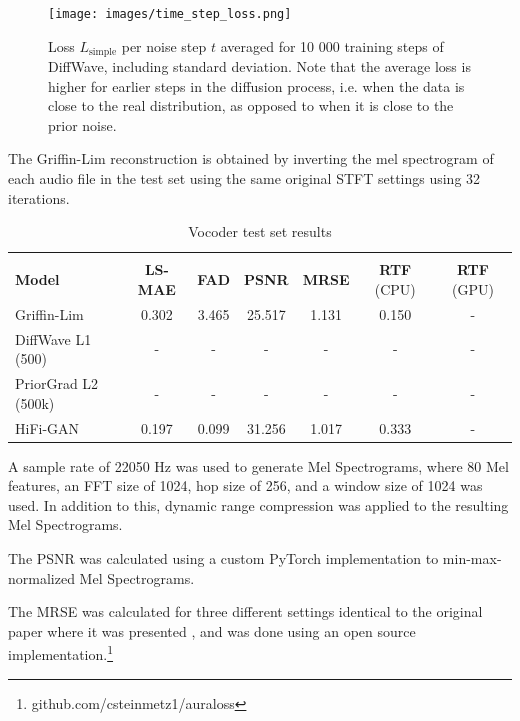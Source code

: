 \documentclass{article}
\begin{document}
\begin{figure}[H]
    \centering
    \texttt{[image: images/time\_step\_loss.png]}
    \caption{\onehalfspacing Loss $L_{\text{simple}}$ per noise step $t$ averaged for 10 000 training steps of DiffWave, including standard deviation. Note that the average loss is higher for earlier steps in the diffusion process, i.e. when the data is close to the real distribution, as opposed to when it is close to the prior noise.}
    \label{fig:timestep_loss}
\end{figure}

The Griffin-Lim reconstruction is obtained by inverting the mel spectrogram of each audio file in the test set using the same original STFT settings using 32 iterations.

\begin{center}
\begin{table}[H]
\def\arraystretch{1.3}
\begin{tabular}{l c c c c c c}
 \hline\hline
 \vspace{-0.5cm} \\
 \textbf{Model} & \textbf{LS-MAE} & \textbf{FAD} & \textbf{PSNR} & \textbf{MRSE} & \textbf{RTF} (CPU) & \textbf{RTF} (GPU) \\ [0.5ex]
 \hline
 Griffin-Lim & 0.302 & 3.465 & 25.517 & 1.131 & 0.150 & - \\
 \hline
 DiffWave L1 (500) & - & - & - & - & - & - \\ 
 \hline
 PriorGrad L2 (500k) & - & - & - & - & - & - \\
 \hline
 HiFi-GAN & 0.197 & 0.099 & 31.256 & 1.017 & 0.333 & - \\
 \hline\hline
\end{tabular}
\caption{Vocoder test set results}
\label{res1}
\end{table}
\end{center}

A sample rate of 22050 Hz was used to generate Mel Spectrograms, where 80 Mel features, an FFT size of 1024, hop size of 256, and a window size of 1024 was used. In addition to this, dynamic range compression was applied to the resulting Mel Spectrograms.



The PSNR was calculated using a custom PyTorch implementation to min-max-normalized Mel Spectrograms.

The MRSE was calculated for three different settings identical to the original paper where it was presented \cite{yamamoto2020parallel}, and was done using an open source implementation.\footnote{github.com/csteinmetz1/auraloss}
\end{document}
